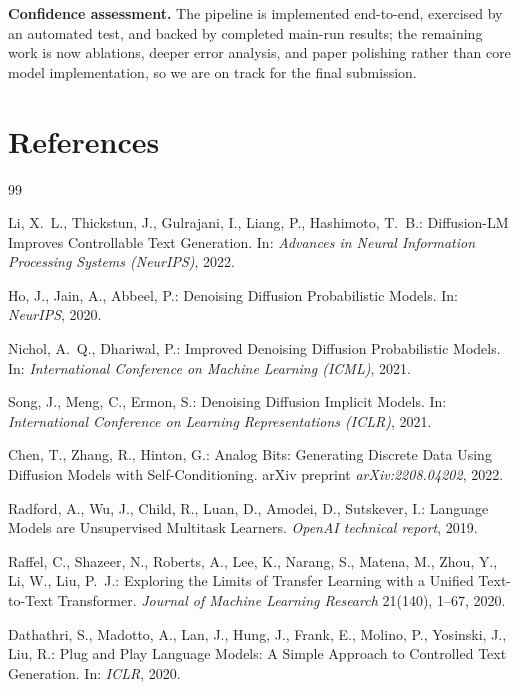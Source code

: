 \documentclass[11pt,a4paper]{article}
\begin{document}
\textbf{Confidence assessment.} The pipeline is implemented end-to-end,
exercised by an automated test, and backed by completed main-run results;
the remaining work is now ablations, deeper error analysis, and paper
polishing rather than core model implementation, so we are on track for the
final submission.

\section*{References}

\begin{thebibliography}{99}

Li, X.~L., Thickstun, J., Gulrajani, I., Liang, P., Hashimoto, T.~B.:
\newblock Diffusion-LM Improves Controllable Text Generation.
\newblock In: \emph{Advances in Neural Information Processing Systems (NeurIPS)}, 2022.

Ho, J., Jain, A., Abbeel, P.:
\newblock Denoising Diffusion Probabilistic Models.
\newblock In: \emph{NeurIPS}, 2020.

Nichol, A.~Q., Dhariwal, P.:
\newblock Improved Denoising Diffusion Probabilistic Models.
\newblock In: \emph{International Conference on Machine Learning (ICML)}, 2021.

Song, J., Meng, C., Ermon, S.:
\newblock Denoising Diffusion Implicit Models.
\newblock In: \emph{International Conference on Learning Representations (ICLR)}, 2021.

Chen, T., Zhang, R., Hinton, G.:
\newblock Analog Bits: Generating Discrete Data Using Diffusion Models with Self-Conditioning.
\newblock arXiv preprint \emph{arXiv:2208.04202}, 2022.

Radford, A., Wu, J., Child, R., Luan, D., Amodei, D., Sutskever, I.:
\newblock Language Models are Unsupervised Multitask Learners.
\newblock \emph{OpenAI technical report}, 2019.

Raffel, C., Shazeer, N., Roberts, A., Lee, K., Narang, S., Matena, M.,
Zhou, Y., Li, W., Liu, P.~J.:
\newblock Exploring the Limits of Transfer Learning with a Unified Text-to-Text Transformer.
\newblock \emph{Journal of Machine Learning Research} 21(140), 1--67, 2020.

Dathathri, S., Madotto, A., Lan, J., Hung, J., Frank, E., Molino, P.,
Yosinski, J., Liu, R.:
\newblock Plug and Play Language Models: A Simple Approach to Controlled Text Generation.
\newblock In: \emph{ICLR}, 2020.


\end{thebibliography}
\end{document}
